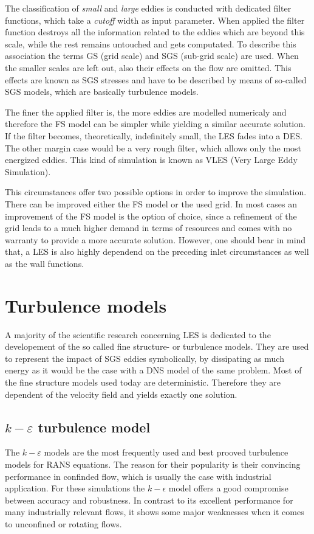 The classification of \emph{small} and \emph{large} eddies is conducted with dedicated filter functions, which take a \emph{cutoff} width as input parameter. When applied the filter function destroys all the information related to the eddies which are beyond this scale, while the rest remains untouched and gets computated. To describe this association the terms GS (grid scale) and SGS (sub-grid scale) are used. When the smaller scales are left out, also their effects on the flow are omitted. This effects are known as SGS stresses and have to be described by means of so-called SGS models, which are basically turbulence models.

The finer the applied filter is, the more eddies are modelled numericaly and therefore the FS model can be simpler while yielding a similar accurate solution. If the filter becomes, theoretically, indefinitely small, the LES fades into a DES. The other margin case would be a very rough filter, which allows only the most energized eddies. This kind of simulation is known as VLES (Very Large Eddy Simulation).

This circumstances offer two possible options in order to improve the simulation. There can be improved either the FS model or the used grid. In most cases an improvement of the FS model is the option of choice, since a refinement of the grid leads to a much higher demand in terms of resources and comes with no warranty to provide a more accurate solution. However, one should bear in mind that, a LES is also highly dependend on the preceding inlet circumstances as well as the wall functions.

\section{Turbulence models}
A majority of the scientific research concerning LES is dedicated to the developement of the so called fine structure- or turbulence models. They are used to represent the impact of SGS eddies symbolically, by dissipating as much energy as it would be the case with a DNS model of the same problem. Most of the fine structure models used today are deterministic. Therefore they are dependent of the velocity field and yields exactly one solution.
\subsection{$k-\varepsilon$ turbulence model}
The $k-\varepsilon$  models are the most frequently used and best prooved turbulence models for RANS equations. The reason for their popularity is their convincing performance in confinded flow, which is usually the case with industrial application. For these simulations the $k-\epsilon$ model offers a good compromise between accuracy and robustness. In contrast to its excellent performance for many industrially relevant flows, it shows some major weaknesses when it comes to unconfined or rotating flows.

